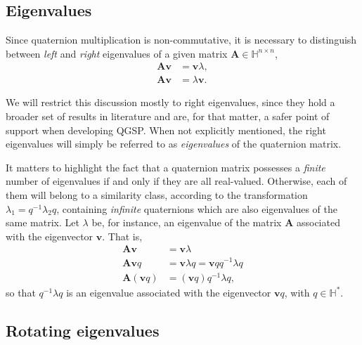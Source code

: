 \subsection{Eigenvalues}
Since quaternion multiplication is non-commutative, it is necessary to distinguish between \textit{left} and \textit{right} eigenvalues of a given matrix $ \mathbf{A} \in \mathbb{H}^{n \times n} $,
\begin{align*}
\mathbf{A} \mathbf{v} &= \mathbf{v} \lambda, \tag{right} \\
\mathbf{A} \mathbf{v} &= \lambda \mathbf{v}.  \tag{left}
\end{align*}

We will restrict this discussion mostly to right eigenvalues, since they hold a broader set of results in literature \cite[Cap. 5]{zhang1997quaternions} and are, for that matter, a safer point of support when developing QGSP. When not explicitly mentioned, the right eigenvalues will simply be referred to as \textit{eigenvalues} of the quaternion matrix.

It matters to highlight the fact that a quaternion matrix possesses a \textit{finite} number of eigenvalues if and only if they are all real-valued. Otherwise, each of them will belong to a similarity class, according to the transformation $ \lambda_1 = q^{-1} \lambda_2 q $, containing \textit{infinite} quaternions which are also eigenvalues of the same matrix. Let $ \lambda $ be, for instance, an eigenvalue of the matrix $ \mathbf{A} $ associated with the eigenvector $ \mathbf{v} $. That is,
\begin{equation}
\begin{aligned}
\label{eq:similar}
\mathbf{A} \mathbf{v} &= \mathbf{v} \lambda \\
\mathbf{A} \mathbf{v} q &= \mathbf{v} \lambda q = \mathbf{v} q q^{-1} \lambda q \\
\mathbf{A} (\mathbf{v} q) &= (\mathbf{v} q) q^{-1} \lambda q,
\end{aligned}
\end{equation}
so that $ q^{-1} \lambda q $ is an eigenvalue associated with the eigenvector $ \mathbf{v}q $, with $ q \in \mathbb{H}^\ast $.

\subsection{Rotating eigenvalues}
\label{subsec:rotacionando}

